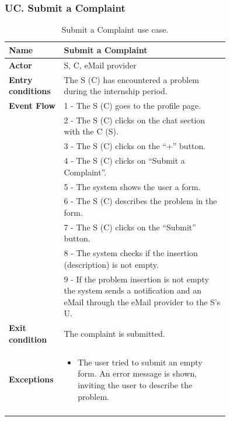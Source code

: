 \subsubsection*{UC\cuc . Submit a Complaint}
\begin{center}
    \begin{longtable}{|l|p{0.75\linewidth}|}
        \hline
        \textbf{Name}               & Submit a Complaint\\
        \hline
        \textbf{Actor}              & S, C, eMail provider\\
        \hline
        \textbf{Entry conditions}   & The S (C) has encountered a problem during the internship period.\\
        \hline
        \textbf{Event Flow}         & 1 - The S (C) goes to the profile page. \\
        & 2 - The S (C) clicks on the chat section with the C (S). \\
        & 3 - The S (C) clicks on the “+” button. \\
        & 4 - The S (C) clicks on “Submit a Complaint”. \\
        & 5 - The system shows the user a form. \\
        & 6 - The S (C) describes the problem in the form. \\
        & 7 - The S (C) clicks on the “Submit” button. \\
        & 8 - The system checks if the insertion (description) is not empty. \\
        & 9 - If the problem insertion is not empty the system sends a notification and an eMail through the eMail provider to the S’s U. \\
        \hline
        \textbf{Exit condition}   & The complaint is submitted. \\       
        \hline
        \textbf{Exceptions}       & \begin{itemize}
            \item The user tried to submit an empty form. An error message is shown, inviting the user to describe the problem.
        \end{itemize}\\
        \hline
        \caption{Submit a Complaint use case.}
        \label{tab: submit_a_complaint_use_case}
    \end{longtable}
\end{center}


